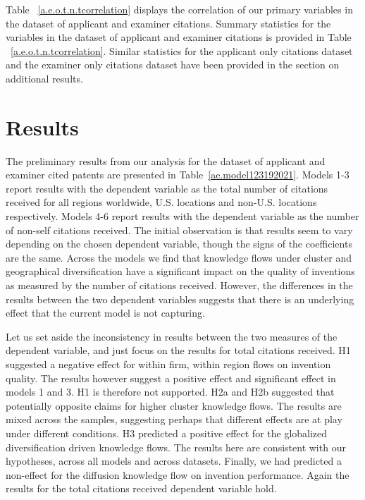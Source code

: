 \documentclass[12pt,letterpaper]{article}
\begin{document}


Table ~\ref{a.e.o.t.n.tcorrelation} displays the correlation of our primary variables in the dataset of applicant and examiner citations. Summary statistics for the variables in the dataset of applicant and examiner citations is provided in Table ~\ref{a.e.o.t.n.tcorrelation}. Similar statistics for the applicant only citations dataset and the examiner only citations dataset have been provided in the section on additional results.


%



%



\section*{Results}
The preliminary results from our analysis for the dataset of applicant and examiner cited patents are presented in Table~\ref{ae.model123192021}. Models 1-3 report results with the dependent variable as the total number of citations received for all regions worldwide, U.S. locations and non-U.S. locations respectively. Models 4-6 report results with the dependent variable as the number of non-self citations received. The initial observation is that results seem to vary depending on the chosen dependent variable, though the signs of the coefficients are the same. Across the models we find that knowledge flows under cluster and geographical diversification have a significant impact on the quality of inventions as measured by the number of citations received. However, the differences in the results between the two dependent variables suggests that there is an underlying effect that the current model is not capturing. \par
Let us set aside the inconsistency in results between the two measures of the dependent variable, and just focus on the results for total citations received. H1 suggested a negative effect for within firm, within region flows on invention quality. The results however suggest a positive effect and significant effect in models 1 and 3. H1 is therefore not supported. H2a and H2b suggested that potentially opposite claims for higher cluster knowledge flows. The results are mixed across the samples, suggesting perhaps that different effects are at play under different conditions. H3 predicted a positive effect for the globalized diversification driven knowledge flows. The results here are consistent with our hypotheses, across all models and across datasets. Finally, we had predicted a non-effect for the diffusion knowledge flow on invention performance. Again the results for the total citations received dependent variable hold.  \par


\end{document}
